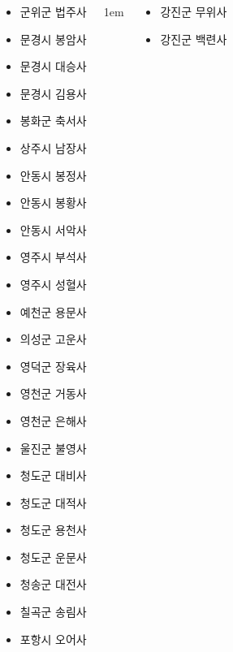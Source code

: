 \documentclass[	20pt, 
							a0paper, 
							landscape,
							margin=0mm, %
							innermargin=10mm,  		%
							blockverticalspace=4mm, %
							colspace=5mm, 
							subcolspace=0mm
							]{tikzposter}
\begin{document}
\begin{columns}
{\begin{LARGE}
\begin{itemize}
					\item 군위군		법주사

					\item 문경시		봉암사
					\item 문경시		대승사
					\item 문경시		김용사

					\item 봉화군		축서사
					\item 상주시		남장사
					\item 안동시		봉정사
					\item 안동시		봉황사	
					\item 안동시		서악사

					\item 영주시		부석사
					\item 영주시		성혈사

					\item 예천군		용문사
					\item 의성군		고운사
					\item 영덕군		장육사

					\item 영천군		거동사
					\item 영천군		은해사

					\item 울진군		불영사

					\item 청도군		대비사
					\item 청도군		대적사
					\item 청도군		용천사
					\item 청도군		운문사

					\item 청송군		대전사
					\item 칠곡군		송림사
					\item 포항시		오어사

					\end{itemize}
				\end{LARGE}
			} %



			{
					\setlength{\leftmargini}{4em}
					\setlength{\labelsep} {1em}
				\begin{LARGE}
					\begin{itemize}
					\item 강진군		무위사
					\item 강진군		백련사


\end{itemize}
\end{LARGE}}
\end{columns}
\end{document}
